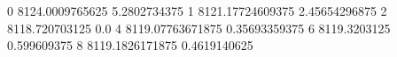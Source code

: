 0 8124.0009765625 5.2802734375
1 8121.17724609375 2.45654296875
2 8118.720703125 0.0
4 8119.07763671875 0.35693359375
6 8119.3203125 0.599609375
8 8119.1826171875 0.4619140625
